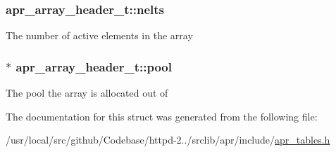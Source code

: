 \subsubsection[{\texorpdfstring{nelts}{nelts}}]{ apr\+\_\+array\+\_\+header\+\_\+t\+::nelts}\hypertarget{structapr__array__header__t_ab11b88220885c5a0920a06ac85680055}{}\label{structapr__array__header__t_ab11b88220885c5a0920a06ac85680055}
The number of active elements in the array 
\subsubsection[{\texorpdfstring{pool}{pool}}]{$\ast$ apr\+\_\+array\+\_\+header\+\_\+t\+::pool}\hypertarget{structapr__array__header__t_a68f353ce65943172fcc9494aa9f6e424}{}\label{structapr__array__header__t_a68f353ce65943172fcc9494aa9f6e424}
The pool the array is allocated out of 

The documentation for this struct was generated from the following file\+:\begin{DoxyCompactItemize}
\item 
/usr/local/src/github/\+Codebase/httpd-\/2../srclib/apr/include/\hyperlink{apr__tables_8h}{apr\+\_\+tables.\+h}\end{DoxyCompactItemize}

